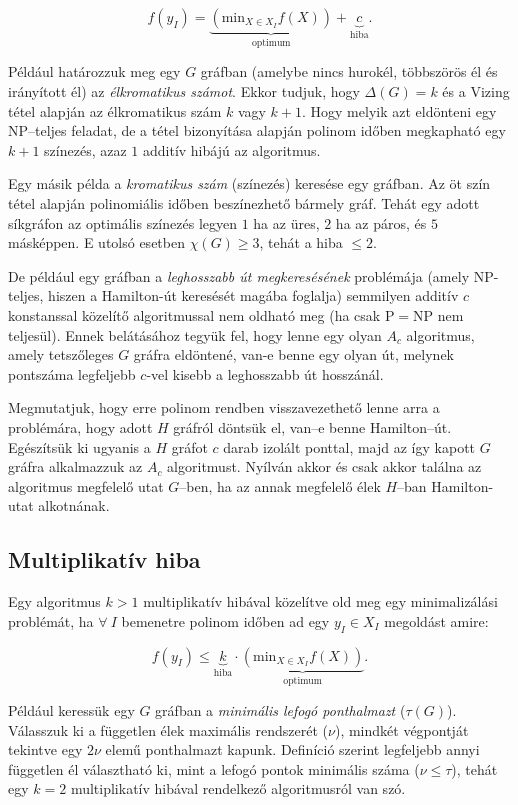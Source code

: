 \[
f(y_I) = \underbrace{(\mbox{min}_{X \in X_I} f(X))}_{\mbox{optimum}} + \underbrace{c}_{\mbox{hiba}}.
\]

Például  határozzuk meg egy $G$ gráfban (amelybe nincs hurokél, többszörös él és
irányított él) az \emph{élkromatikus számot}. Ekkor tudjuk, hogy $\Delta(G)=k$ és a
Vizing tétel alapján az élkromatikus szám $k$ vagy $k+1$. Hogy melyik azt
eldönteni egy NP--teljes feladat, de a tétel bizonyítása alapján polinom időben
megkapható egy $k+1$ színezés, azaz $1$ additív hibájú az algoritmus.

Egy másik példa a \emph{kromatikus szám} (színezés) keresése egy gráfban. Az öt szín
tétel alapján polinomiális időben beszínezhető bármely gráf. Tehát egy adott
síkgráfon az optimális színezés legyen $1$ ha az üres, $2$ ha az páros, és $5$
másképpen. E utolsó esetben $\chi(G) \geq 3$, tehát a hiba $\leq 2$.

De például egy gráfban a \emph{leghosszabb út megkeresésének} problémája (amely
NP-teljes, hiszen a Hamilton-út keresését magába foglalja) semmilyen additív $c$
konstanssal közelítő algoritmussal nem oldható meg (ha csak P$=$NP nem teljesül). 
Ennek belátásához tegyük fel, hogy lenne egy olyan $A_c$ algoritmus, amely
tetszőleges $G$ gráfra eldöntené, van-e benne egy olyan út, melynek pontszáma
legfeljebb $c$-vel kisebb a leghosszabb út hosszánál.

Megmutatjuk, hogy erre polinom rendben visszavezethető lenne arra a problémára,
hogy adott $H$ gráfról döntsük el, van--e benne Hamilton--út. Egészítsük ki
ugyanis a $H$ gráfot $c$ darab izolált ponttal, majd az így kapott $G$ gráfra
alkalmazzuk az $A_c$ algoritmust. Nyílván akkor és csak akkor találna az
algoritmus megfelelő utat $G$--ben, ha az annak megfelelő élek $H$--ban
Hamilton-utat alkotnának.

\subsection{Multiplikatív hiba}

Egy algoritmus $k>1$ multiplikatív hibával közelítve old meg egy minimalizálási
problémát, ha $\forall~I$ bemenetre polinom időben ad egy $y_I \in X_I$
megoldást amire:


\[
f(y_I) \leq \underbrace{k}_{\mbox{hiba}}  \cdot \underbrace{(\mbox{min}_{X \in X_I} f(X))}_{\mbox{optimum}}.
\]

Például keressük egy $G$ gráfban a \emph{minimális lefogó ponthalmazt} ($\tau(G)$).
Válasszuk ki a független élek maximális rendszerét ($\nu$), mindkét végpontját
tekintve egy $2\nu$ elemű ponthalmazt kapunk. Definíció szerint legfeljebb annyi
független él választható ki, mint a lefogó pontok minimális száma ($\nu \leq
\tau$), tehát egy $k=2$ multiplikatív hibával rendelkező algoritmusról van szó.

